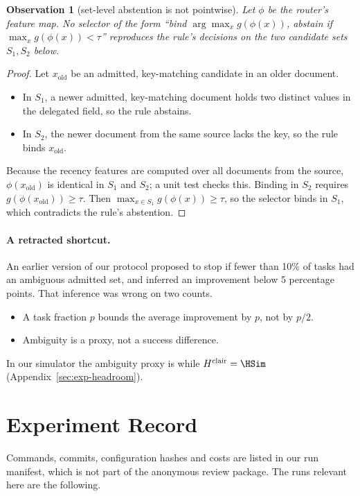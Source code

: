 \documentclass{article}
\newtheorem{observation}{Observation}
\begin{document}
\begin{observation}[set-level abstention is not pointwise]
\label{obs:set}
Let $\phi$ be the router's feature map. No selector of the form ``bind
$\arg\max_x g(\phi(x))$, abstain if $\max_x g(\phi(x))<\tau$'' reproduces
the rule's decisions on the two candidate sets $S_1,S_2$ below.
\end{observation}
\begin{proof}
Let $x_{\mathrm{old}}$ be an admitted, key-matching candidate in an older
document.
\begin{itemize}
\item In $S_1$, a newer admitted, key-matching document holds two distinct
values in the delegated field, so the rule abstains.
\item In $S_2$, the newer document from the same source lacks the key, so the
rule binds $x_{\mathrm{old}}$.
\end{itemize}
Because the recency features are computed over all documents from the
source, $\phi(x_{\mathrm{old}})$ is identical in $S_1$ and $S_2$; a unit test
checks this. Binding in $S_2$ requires $g(\phi(x_{\mathrm{old}}))\ge\tau$.
Then $\max_{x\in S_1}g(\phi(x))\ge\tau$, so the selector binds in $S_1$,
which contradicts the rule's abstention.
\end{proof}

\paragraph{A retracted shortcut.}
An earlier version of our protocol proposed to stop if fewer than 10\% of
tasks had an ambiguous admitted set, and inferred an improvement below 5
percentage points. That inference was wrong on two counts.
\begin{itemize}
\item A task fraction $p$ bounds the average improvement by $p$, not by
$p/2$.
\item Ambiguity is a proxy, not a success difference.
\end{itemize}
In our simulator the ambiguity proxy is \ProxySim{} while
$H^{\mathrm{clair}}=\HSim$ (Appendix~\ref{sec:exp-headroom}).

\section{Experiment Record}
\label{app:record}
Commands, commits, configuration hashes and costs are listed in our run
manifest, which is not part of the anonymous review package. The runs relevant here are the following.
\end{document}

